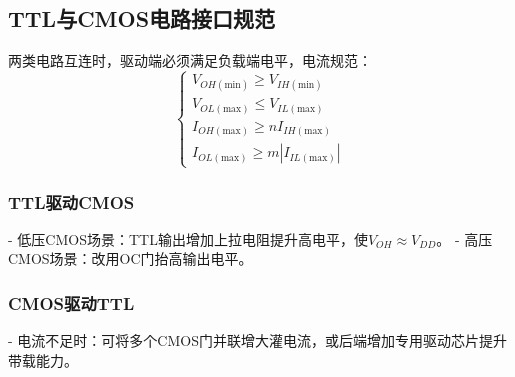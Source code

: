 \subsection{TTL与CMOS电路接口规范}
两类电路互连时，驱动端必须满足负载端电平，电流规范：
\[
\begin{cases}
V_{OH(\text{min})} \ge V_{IH(\text{min})}\\
V_{OL(\text{max})} \le V_{IL(\text{max})}\\
I_{OH(\text{max})} \ge nI_{IH(\text{max})}\\
I_{OL(\text{max})} \ge m|I_{IL(\text{max})}|
\end{cases}
\]

\subsubsection{TTL驱动CMOS}
- 低压CMOS场景：TTL输出增加上拉电阻提升高电平，使\(V_{OH}\approx V_{DD}\)。
- 高压CMOS场景：改用OC门抬高输出电平。

\subsubsection{CMOS驱动TTL}
- 电流不足时：可将多个CMOS门并联增大灌电流，或后端增加专用驱动芯片提升带载能力。